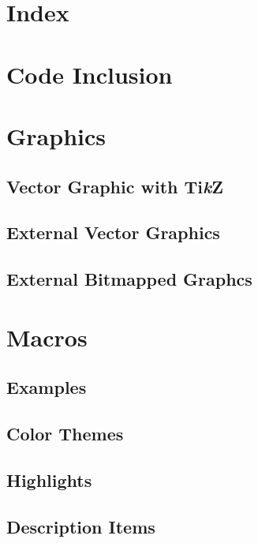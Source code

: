 \section{Index}

\section{Code Inclusion}

\section{Graphics}
\subsection{Vector Graphic with Ti\textit{k}Z}
\subsection{External Vector Graphics}
\subsection{External Bitmapped Graphcs}

\section{Macros}


\subsection{Examples}

\subsection{Color Themes}
\subsection{Highlights}
\subsection{Description Items}

